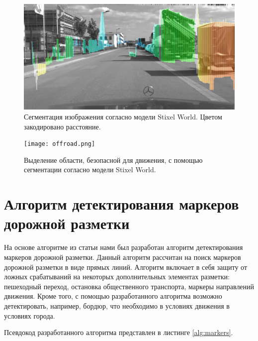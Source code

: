 \documentclass[aps,%
14pt,%
final,%
oneside,
onecolumn,%
musixtex, %
superscriptaddress,%
centertags]{extarticle} %
\begin{document}
\begin{figure}[H]
\centering
\includegraphics[width=\textwidth]{small_object.png}
\caption{Сегментация изображения согласно модели Stixel World. Цветом закодировано расстояние.}
\label{fig:stix_small}
\end{figure}

\begin{figure}[H]
\centering
\texttt{[image: offroad.png]}
\caption{Выделение области, безопасной для движения, с помощью сегментации согласно модели Stixel World.}
\label{fig:stix_offroad}
\end{figure}






\newpage
\section{Алгоритм детектирования маркеров дорожной разметки}

На основе алгоритме из статьи \cite{aly2008real} нами был разработан алгоритм детектирования маркеров дорожной разметки. Данный алгоритм рассчитан на поиск маркеров дорожной разметки в виде прямых линий. Алгоритм включает в себя защиту от ложных срабатываний на некоторых дополнительных элементах разметки: пешеходный переход, остановка общественного транспорта, маркеры направлений движения. Кроме того, с помощью разработанного алгоритма возможно детектировать, например, бордюр, что необходимо в условиях движения в условиях города.

Псевдокод разработанного алгоритма представлен в листинге \ref{alg:markers}.
\end{document}
